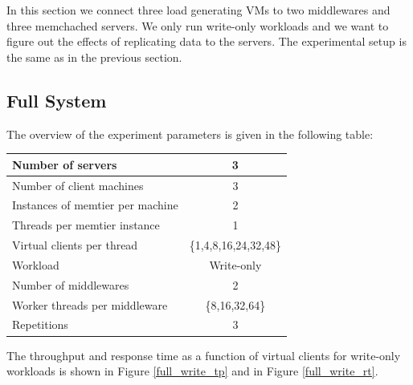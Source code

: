 In this section we connect three load generating VMs to two middlewares and three memchached servers. We only run write-only workloads and we want to figure out the effects of replicating data to the servers. The experimental setup is the same as in the previous section.  

\subsection{Full System}
The overview of the experiment parameters is given in the following table:
\begin{center}
	\scriptsize{
		\begin{tabular}{|l|c|}
			\hline Number of servers                & 3          \\ 
			\hline Number of client machines        & 3          \\ 
			\hline Instances of memtier per machine & 2          \\ 
			\hline Threads per memtier instance     & 1          \\
			\hline Virtual clients per thread       & \{1,4,8,16,24,32,48\}    \\ 
			\hline Workload                         & Write-only \\
			\hline Number of middlewares            & 2          \\
			\hline Worker threads per middleware    & \{8,16,32,64\}   \\
			\hline Repetitions                      & 3   \\ 
			\hline 
		\end{tabular}
	} 
\end{center}
The throughput and response time as a function of virtual clients for write-only workloads is shown in Figure \ref{full_write_tp} and in Figure \ref{full_write_rt}. 
